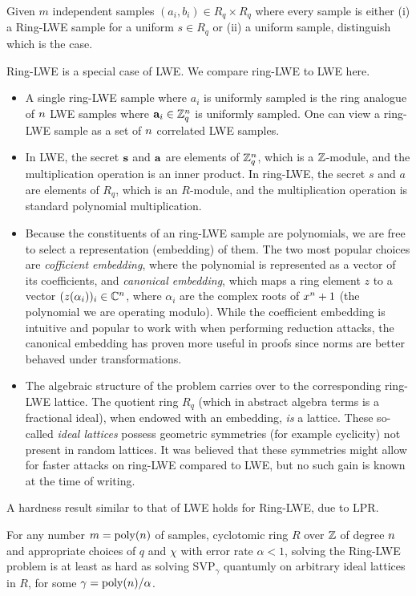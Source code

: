 \begin{definition}
    Given $m$ independent samples $(a_i, b_i) \in R_q \times R_q$ where every sample is either (i) a Ring-LWE sample for a uniform $s \in R_q$ or (ii) a uniform sample, distinguish which is the case.
\end{definition}

Ring-LWE is a special case of LWE. We compare ring-LWE to LWE here.
\begin{itemize}
    \item A single ring-LWE sample where $a_i$ is uniformly sampled is the ring analogue of $n$ LWE samples where $\mathbf{a}_i \in \mathbb{Z}_q^{n}$ is uniformly sampled. One can view a ring-LWE sample as a set of $n$ correlated LWE samples.
    \item In LWE, the secret $\mathbf{s}$ and $\mathbf{a}$ are elements of $\mathbb{Z}_q^{n}$, which is a $\mathbb{Z}$-module, and the multiplication operation is an inner product. In ring-LWE, the secret $s$ and $a$ are elements of $R_q$, which is an $R$-module, and the multiplication operation is standard polynomial multiplication.
    \item Because the constituents of an ring-LWE sample are polynomials, we are free to select a representation (embedding) of them. The two most popular choices are \textit{cofficient embedding}, where the polynomial is represented as a vector of its coefficients, and \textit{canonical embedding}, which maps a ring element $z$ to a vector $(z(\alpha_i))_i \in \mathbb{C}^{n}$, where $\alpha_i$ are the complex roots of $x^{n} + 1$ (the polynomial we are operating modulo). While the coefficient embedding is intuitive and popular to work with when performing reduction attacks, the canonical embedding has proven more useful in proofs since norms are better behaved under transformations.
    \item The algebraic structure of the problem carries over to the corresponding ring-LWE lattice. The quotient ring $R_q$ (which in abstract algebra terms is a fractional ideal), when endowed with an embedding, \textit{is} a lattice. These so-called \textit{ideal lattices} possess geometric symmetries (for example cyclicity) not present in random lattices. It was believed that these symmetries might allow for faster attacks on ring-LWE compared to LWE, but no such gain is known at the time of writing.
\end{itemize}

A hardness result similar to that of LWE holds for Ring-LWE, due to LPR.
\begin{theorem}
    For any number $m = \operatorname{poly}(n)$ of samples, cyclotomic ring $R$ over $\mathbb{Z}$ of degree $n$ and appropriate choices of $q$ and $\chi$ with error rate $\alpha < 1$, solving the Ring-LWE problem is at least as hard as solving SVP$_\gamma$ quantumly on arbitrary ideal lattices in $R$, for some $\gamma = \operatorname{poly}(n)/\alpha$.
\end{theorem}


